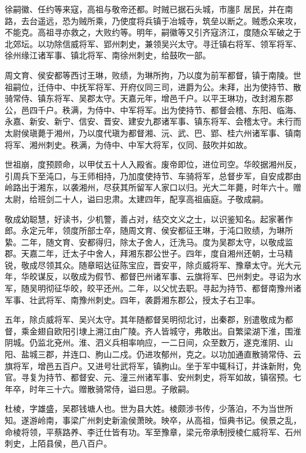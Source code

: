 \documentclass[]{article}
\begin{document}
徐嗣徽、任约等来寇，高祖与敬帝还都。时贼已据石头城，市廛阝居民，并在南路，去台遥远，恐为贼所乘，乃使度将兵镇于冶城寺，筑垒以断之。贼悉众来攻，不能克。高祖寻亦救之，大败约等。明年，嗣徽等又引齐寇济江，度随众军破之于北郊坛。以功除信威将军、郢州刺史，兼领吴兴太守。寻迁镇右将军、领军将军、徐州缘江诸军事、镇北将军、南徐州刺史，给鼓吹一部。

周文育、侯安都等西讨王琳，败绩，为琳所拘，乃以度为前军都督，镇于南陵。世祖嗣位，迁侍中、中抚军将军、开府仪同三司，进爵为公。未拜，出为使持节、散骑常侍、镇东将军、吴郡太守。天嘉元年，增邑千户。以平王琳功，改封湘东郡公，邑四千户。秩满，为侍中、中军将军。出为使持节、都督会稽、东阳、临海、永嘉、新安、新宁、信安、晋安、建安九郡诸军事、镇东将军、会稽太守。未行而太尉侯瑱薨于湘州，乃以度代瑱为都督湘、沅、武、巴、郢、桂六州诸军事、镇南将军、湘州刺史。秩满，为侍中、中军大将军，仪同、鼓吹并如故。

世祖崩，度预顾命，以甲仗五十人入殿省。废帝即位，进位司空。华皎据湘州反，引周兵下至沌口，与王师相持，乃加度使持节、车骑将军，总督步军，自安成郡由岭路出于湘东，以袭湘州，尽获其所留军人家口以归。光大二年薨，时年六十。赠太尉，给班剑二十人，谥曰忠肃。太建四年，配享高祖庙庭。子敬成嗣。

敬成幼聪慧，好读书，少机警，善占对，结交文义之士，以识鉴知名。起家著作郎。永定元年，领度所部士卒，随周文育、侯安都征王琳，于沌口败绩，为琳所絷。二年，随文育、安都得归，除太子舍人，迁洗马。度为吴郡太守，以敬成监郡。天嘉二年，迁太子中舍人，拜湘东郡公世子。四年，度自湘州还朝，士马精锐，敬成尽领其众。随章昭达征陈宝应，晋安平，除贞威将军、豫章太守。光大元年，华皎谋反，以敬成为假节、都督巴州诸军事、云旗将军、巴州刺史。寻诏为水军，随吴明彻征华皎，皎平还州。二年，以父忧去职。寻起为持节、都督南豫州诸军事、壮武将军、南豫州刺史。四年，袭爵湘东郡公，授太子右卫率。

五年，除贞威将军、吴兴太守。其年随都督吴明彻北讨，出秦郡，别遣敬成为都督，乘金翅自欧阳引埭上溯江由广陵。齐人皆城守，弗敢出。自繁梁湖下淮，围淮阴城。仍监北兗州。淮、泗义兵相率响应，一二日间，众至数万，遂克淮阴、山阳、盐城三郡，并连口、朐山二戍。仍进攻郁州，克之。以功加通直散骑常侍、云旗将军，增邑五百户。又进号壮武将军，镇朐山。坐于军中辄科订，并诛新附，免官。寻复为持节、都督安、元、潼三州诸军事、安州刺史，将军如故，镇宿预。七年卒，时年三十六。赠散骑常侍，谥曰思。子敞嗣。

杜棱，字雄盛，吴郡钱塘人也。世为县大姓。棱颇涉书传，少落泊，不为当世所知。遂游岭南，事梁广州刺史新渝侯萧映。映卒，从高祖，恒典书记。侯景之乱，命棱将领，平蔡路养、李迁仕皆有功。军至豫章，梁元帝承制授棱仁威将军、石州刺史，上陌县侯，邑八百户。
\end{document}
